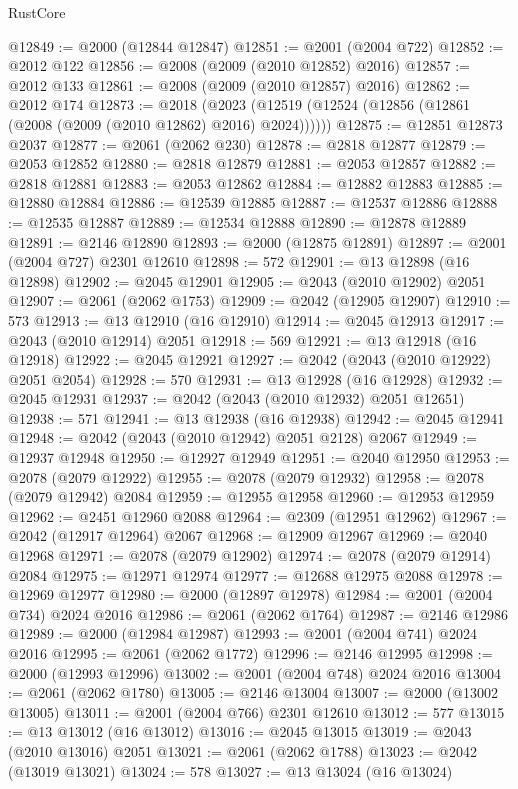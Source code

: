 \begin{lexlean}{RustCore}
\begin{coremodule}
@12849 := @2000 (@12844 @12847)
@12851 := @2001 (@2004 @722)
@12852 := @2012 @122
@12856 := @2008 (@2009 (@2010 @12852) @2016)
@12857 := @2012 @133
@12861 := @2008 (@2009 (@2010 @12857) @2016)
@12862 := @2012 @174
@12873 := @2018
    (@2023 (@12519 (@12524 (@12856 (@12861 (@2008 (@2009 (@2010 @12862) @2016) @2024))))))
@12875 := @12851 @12873 @2037
@12877 := @2061 (@2062 @230)
@12878 := @2818 @12877
@12879 := @2053 @12852
@12880 := @2818 @12879
@12881 := @2053 @12857
@12882 := @2818 @12881
@12883 := @2053 @12862
@12884 := @12882 @12883
@12885 := @12880 @12884
@12886 := @12539 @12885
@12887 := @12537 @12886
@12888 := @12535 @12887
@12889 := @12534 @12888
@12890 := @12878 @12889
@12891 := @2146 @12890
@12893 := @2000 (@12875 @12891)
@12897 := @2001 (@2004 @727) @2301 @12610
@12898 := 572
@12901 := @13 @12898 (@16 @12898)
@12902 := @2045 @12901
@12905 := @2043 (@2010 @12902) @2051
@12907 := @2061 (@2062 @1753)
@12909 := @2042 (@12905 @12907)
@12910 := 573
@12913 := @13 @12910 (@16 @12910)
@12914 := @2045 @12913
@12917 := @2043 (@2010 @12914) @2051
@12918 := 569
@12921 := @13 @12918 (@16 @12918)
@12922 := @2045 @12921
@12927 := @2042 (@2043 (@2010 @12922) @2051 @2054)
@12928 := 570
@12931 := @13 @12928 (@16 @12928)
@12932 := @2045 @12931
@12937 := @2042 (@2043 (@2010 @12932) @2051 @12651)
@12938 := 571
@12941 := @13 @12938 (@16 @12938)
@12942 := @2045 @12941
@12948 := @2042 (@2043 (@2010 @12942) @2051 @2128) @2067
@12949 := @12937 @12948
@12950 := @12927 @12949
@12951 := @2040 @12950
@12953 := @2078 (@2079 @12922)
@12955 := @2078 (@2079 @12932)
@12958 := @2078 (@2079 @12942) @2084
@12959 := @12955 @12958
@12960 := @12953 @12959
@12962 := @2451 @12960 @2088
@12964 := @2309 (@12951 @12962)
@12967 := @2042 (@12917 @12964) @2067
@12968 := @12909 @12967
@12969 := @2040 @12968
@12971 := @2078 (@2079 @12902)
@12974 := @2078 (@2079 @12914) @2084
@12975 := @12971 @12974
@12977 := @12688 @12975 @2088
@12978 := @12969 @12977
@12980 := @2000 (@12897 @12978)
@12984 := @2001 (@2004 @734) @2024 @2016
@12986 := @2061 (@2062 @1764)
@12987 := @2146 @12986
@12989 := @2000 (@12984 @12987)
@12993 := @2001 (@2004 @741) @2024 @2016
@12995 := @2061 (@2062 @1772)
@12996 := @2146 @12995
@12998 := @2000 (@12993 @12996)
@13002 := @2001 (@2004 @748) @2024 @2016
@13004 := @2061 (@2062 @1780)
@13005 := @2146 @13004
@13007 := @2000 (@13002 @13005)
@13011 := @2001 (@2004 @766) @2301 @12610
@13012 := 577
@13015 := @13 @13012 (@16 @13012)
@13016 := @2045 @13015
@13019 := @2043 (@2010 @13016) @2051
@13021 := @2061 (@2062 @1788)
@13023 := @2042 (@13019 @13021)
@13024 := 578
@13027 := @13 @13024 (@16 @13024)

\end{coremodule}
\end{lexlean}
